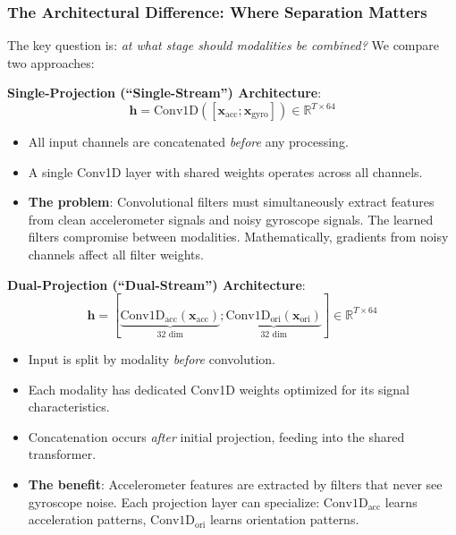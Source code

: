 \subsubsection{The Architectural Difference: Where Separation Matters}

The key question is: \textit{at what stage should modalities be combined?} We compare two approaches:

\textbf{Single-Projection (``Single-Stream'') Architecture}:
\begin{equation}
\mathbf{h} = \text{Conv1D}([\mathbf{x}_\text{acc}; \mathbf{x}_\text{gyro}]) \in \mathbb{R}^{T \times 64}
\end{equation}
\begin{itemize}
    \item All input channels are concatenated \textit{before} any processing.
    \item A single Conv1D layer with shared weights operates across all channels.
    \item \textbf{The problem}: Convolutional filters must simultaneously extract features from clean accelerometer signals and noisy gyroscope signals. The learned filters compromise between modalities. Mathematically, gradients from noisy channels affect all filter weights.
\end{itemize}

\textbf{Dual-Projection (``Dual-Stream'') Architecture}:
\begin{equation}
\mathbf{h} = [\underbrace{\text{Conv1D}_\text{acc}(\mathbf{x}_\text{acc})}_{\text{32 dim}}; \underbrace{\text{Conv1D}_\text{ori}(\mathbf{x}_\text{ori})}_{\text{32 dim}}] \in \mathbb{R}^{T \times 64}
\end{equation}
\begin{itemize}
    \item Input is split by modality \textit{before} convolution.
    \item Each modality has dedicated Conv1D weights optimized for its signal characteristics.
    \item Concatenation occurs \textit{after} initial projection, feeding into the shared transformer.
    \item \textbf{The benefit}: Accelerometer features are extracted by filters that never see gyroscope noise. Each projection layer can specialize: $\text{Conv1D}_\text{acc}$ learns acceleration patterns, $\text{Conv1D}_\text{ori}$ learns orientation patterns.
\end{itemize}

